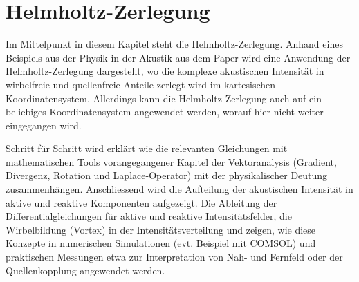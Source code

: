 %
%
%
%
\chapter{Helmholtz-Zerlegung\label{chapter:helmholtz}}
\begin{refsection}

Im Mittelpunkt in diesem Kapitel steht die Helmholtz-Zerlegung.
Anhand eines Beispiels aus der Physik in der Akustik aus dem Paper
\cite{helmholtz:paper}
wird eine Anwendung der Helmholtz-Zerlegung
dargestellt, wo die komplexe akustischen Intensität in wirbelfreie
und quellenfreie Anteile zerlegt wird im kartesischen Koordinatensystem.
Allerdings kann die Helmholtz-Zerlegung auch auf ein beliebiges
Koordinatensystem angewendet werden, worauf hier nicht weiter
eingegangen wird. \newline


Schritt für Schritt wird erklärt wie die relevanten Gleichungen mit mathematischen Tools vorangegangener Kapitel der Vektoranalysis (Gradient, Divergenz, Rotation und Laplace-Operator) mit der physikalischer Deutung zusammenhängen. Anschliessend wird die Aufteilung der akustischen Intensität in aktive und reaktive Komponenten aufgezeigt. Die Ableitung der Differentialgleichungen für aktive und reaktive Intensitätsfelder, die Wirbelbildung (Vortex) in der Intensitätsverteilung und zeigen, wie diese Konzepte in numerischen Simulationen (evt. Beispiel mit COMSOL) und praktischen Messungen etwa zur Interpretation von Nah- und Fernfeld oder der Quellenkopplung angewendet werden.













\printbibliography[heading=subbibliography]
\end{refsection}
